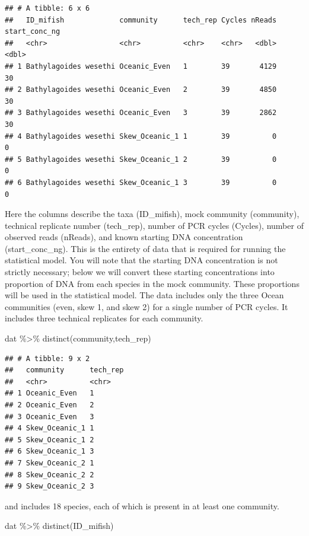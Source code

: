 \documentclass[
]{article}
\newenvironment{Shaded}{\begin{snugshade}}{\end{snugshade}}
\newcommand{\FunctionTok}[1]{\textcolor[rgb]{0.00,0.00,0.00}{#1}}
\newcommand{\NormalTok}[1]{#1}
\newcommand{\SpecialCharTok}[1]{\textcolor[rgb]{0.00,0.00,0.00}{#1}}
\begin{document}
\begin{verbatim}
## # A tibble: 6 x 6
##   ID_mifish             community      tech_rep Cycles nReads start_conc_ng
##   <chr>                 <chr>          <chr>    <chr>   <dbl>         <dbl>
## 1 Bathylagoides wesethi Oceanic_Even   1        39       4129            30
## 2 Bathylagoides wesethi Oceanic_Even   2        39       4850            30
## 3 Bathylagoides wesethi Oceanic_Even   3        39       2862            30
## 4 Bathylagoides wesethi Skew_Oceanic_1 1        39          0             0
## 5 Bathylagoides wesethi Skew_Oceanic_1 2        39          0             0
## 6 Bathylagoides wesethi Skew_Oceanic_1 3        39          0             0
\end{verbatim}

Here the columns describe the taxa (ID\_mifish), mock community
(community), technical replicate number (tech\_rep), number of PCR
cycles (Cycles), number of observed reads (nReads), and known starting
DNA concentration (start\_conc\_ng). This is the entirety of data that
is required for running the statistical model. You will note that the
starting DNA concentration is not strictly necessary; below we will
convert these starting concentrations into proportion of DNA from each
species in the mock community. These proportions will be used in the
statistical model. The data includes only the three Ocean communities
(even, skew 1, and skew 2) for a single number of PCR cycles. It
includes three technical replicates for each community.

\begin{Shaded}
\begin{Highlighting}[]
\NormalTok{dat }\SpecialCharTok{\%\textgreater{}\%} \FunctionTok{distinct}\NormalTok{(community,tech\_rep)}
\end{Highlighting}
\end{Shaded}

\begin{verbatim}
## # A tibble: 9 x 2
##   community      tech_rep
##   <chr>          <chr>   
## 1 Oceanic_Even   1       
## 2 Oceanic_Even   2       
## 3 Oceanic_Even   3       
## 4 Skew_Oceanic_1 1       
## 5 Skew_Oceanic_1 2       
## 6 Skew_Oceanic_1 3       
## 7 Skew_Oceanic_2 1       
## 8 Skew_Oceanic_2 2       
## 9 Skew_Oceanic_2 3
\end{verbatim}

and includes 18 species, each of which is present in at least one
community.

\begin{Shaded}
\begin{Highlighting}[]
\NormalTok{dat }\SpecialCharTok{\%\textgreater{}\%} \FunctionTok{distinct}\NormalTok{(ID\_mifish)}
\end{Highlighting}
\end{Shaded}
\end{document}
